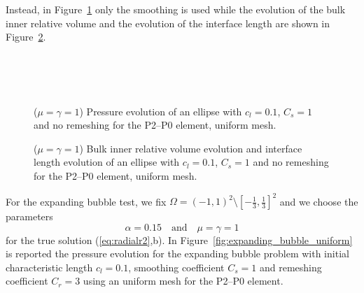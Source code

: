 \documentclass[a4paper,12pt,onecolumn]{article}
\begin{document}
Instead, in Figure~\ref{fig:ellipse_smooth} only the smoothing is used while the evolution of the bulk inner relative volume and the evolution of the interface length are shown in Figure~\ref{fig:ellipse_smooth_volumes}.
\begin{figure}[htbp]
  \centering
  \\
  \quad
  \\
  \quad
  \\
  \caption{($\mu=\gamma=1$) Pressure evolution of an ellipse with $c_l=0.1$, $C_s=1$ and no remeshing for the P2--P0 element, uniform mesh.}
  \label{fig:ellipse_smooth}
\end{figure}

\begin{figure}[htbp]
  \centering
  \caption{($\mu=\gamma=1$) Bulk inner relative volume evolution and interface length evolution of an ellipse with $c_l=0.1$, $C_s=1$ and no remeshing for the P2--P0 element, uniform mesh.}
  \label{fig:ellipse_smooth_volumes}
\end{figure}

For the expanding bubble test, we fix $\Omega = (-1,1)^2 \setminus [-\frac13,\frac13]^2$ and we choose the parameters
\begin{equation*}
\alpha = 0.15 \quad\text{and}\quad \mu = \gamma = 1
\end{equation*}
for the true solution (\ref{eq:radialr2},b). In Figure~\ref{fig:expanding_bubble_uniform} is reported the pressure evolution for the expanding bubble problem with initial characteristic length $c_l=0.1$, smoothing coefficient $C_s=1$ and remeshing coefficient $C_r=3$ using an uniform mesh for the P2--P0 element.
\end{document}
